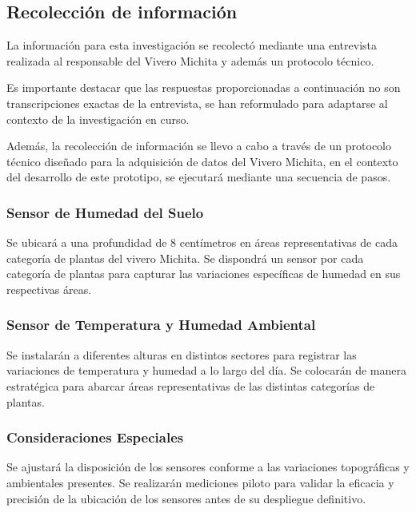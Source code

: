 \subsection{Recolección de información}
La información para esta investigación se recolectó mediante una entrevista realizada al responsable del Vivero Michita y además un protocolo técnico.

\bigbreak
Es importante destacar que las respuestas proporcionadas a continuación no son
transcripciones exactas de la entrevista, se han reformulado para adaptarse al
contexto de la investigación en curso.
\newpage


Además, la recolección de información se llevo a cabo a través de un protocolo técnico diseñado para la adquisición de datos del Vivero Michita, en el contexto del desarrollo de este prototipo, se ejecutará mediante una secuencia de pasos.

\subsubsection*{Sensor de Humedad del Suelo}
Se ubicará a una profundidad de 8 centímetros en áreas representativas de cada categoría de plantas del vivero Michita. Se dispondrá un sensor por cada categoría de plantas para capturar las variaciones específicas de humedad en sus respectivas áreas.

\subsubsection*{Sensor de Temperatura y Humedad Ambiental}
Se instalarán a diferentes alturas en distintos sectores para registrar las variaciones de temperatura y humedad a lo largo del día. Se colocarán de manera estratégica para abarcar áreas representativas de las distintas categorías de plantas.

\subsubsection*{Consideraciones Especiales}
Se ajustará la disposición de los sensores conforme a las variaciones topográficas y ambientales presentes. Se realizarán mediciones piloto para validar la eficacia y precisión de la ubicación de los sensores antes de su despliegue definitivo.